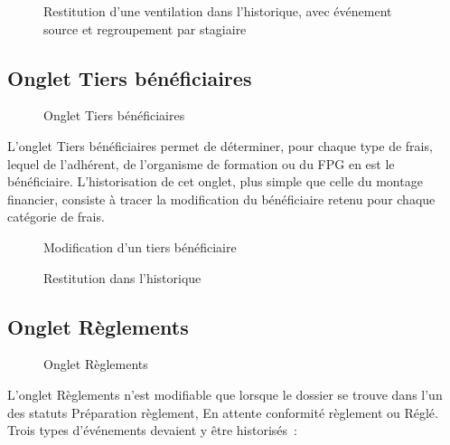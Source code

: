 \begin{figure}[H]
  \centering
  \caption{Restitution d'une ventilation dans l'historique, avec
    événement source et regroupement par stagiaire}
  \label{fig:montage-ventilation-hist}
\end{figure}

\subsection{Onglet Tiers bénéficiaires}

\begin{figure}[H]
  \centering
  \caption{Onglet Tiers bénéficiaires}
  \label{fig:onglet-tiers}
\end{figure}

L'onglet Tiers bénéficiaires permet de déterminer, pour chaque type de
frais, lequel de l'adhérent, de l'organisme de formation ou du FPG en est
le bénéficiaire. L'historisation de cet onglet, plus simple que celle du
montage financier, consiste à tracer la modification du bénéficiaire
retenu pour chaque catégorie de frais.

\begin{figure}[H]
  \centering
  \caption{Modification d'un tiers bénéficiaire}
  \label{fig:modif-tiers}
\end{figure}

\begin{figure}[H]
  \centering
  \caption{Restitution dans l'historique}
  \label{fig:modif-tiers-hist}
\end{figure}

\subsection{Onglet Règlements}

\begin{figure}[H]
  \centering
  \caption{Onglet Règlements}
  \label{fig:onglet-reglements}
\end{figure}

L'onglet Règlements n'est modifiable que lorsque le dossier se trouve
dans l'un des statuts \og{}Préparation règlement\fg{}, \og{}En attente
conformité règlement\fg{} ou \og{}Réglé\fg{}. Trois types d'événements
devaient y être historisés~:

